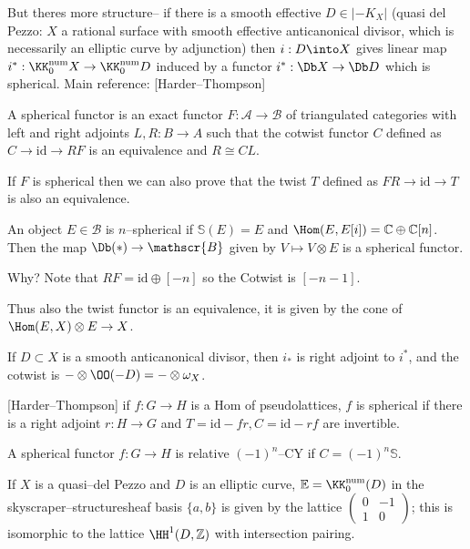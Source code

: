 But theres more structure-- if there is a smooth effective \(D\in |-K_X|\)
(quasi del Pezzo: \(X\) a rational surface with smooth effective anticanonical
divisor, which is necessarily an elliptic curve by adjunction) then \(i:D\into
X\) gives linear map \(i^\ast:\KK_0^\text{num}X\to \KK_0^\text{num}D\)
induced by a functor \(i^\ast: \Db X \to \Db D\) which is spherical. Main
reference: [Harder--Thompson]

\begin{definition}
    A spherical functor is an exact functor \(F:\mathcal{A}\to \mathcal{B}\) of
    triangulated categories with left and right adjoints \(L,R:B\to A\) such
    that the cotwist functor \(C\) defined as \(C\to \text{id}\to RF\) is an
    equivalence and \(R\cong CL\).
\end{definition}

If \(F\) is spherical then we can also prove that the twist \(T\) defined as
\(FR\to \text{id}\to T\) is also an equivalence.

\begin{example}
    An object \(E\in \mathscr{B}\) is \(n\)--spherical if \(\mathbb{S}(E)=E\)
    and \(\Hom(E,E[i])=\mathbb{C}\oplus \mathbb{C}[n]\).
    Then the map \(\Db(\ast)\to \mathscr{B}\) given by \(V\mapsto V\otimes E\)
    is a spherical functor.

    Why? Note that \(RF=\text{id}\oplus [-n]\) so the Cotwist is \([-n-1]\).

    Thus also the twist functor is an equivalence, it is given by the cone of
    \(\Hom(E,X)\otimes E \to X\).
\end{example}

If \(D\subset X\) is a smooth anticanonical divisor, then \(i_\ast\) is right
adjoint to \(i^\ast\),  and the cotwist is \(-\otimes \OO(-D)=-\otimes\omega_X\).

[Harder--Thompson] if \(f:G\to H\) is a Hom of pseudolattices, \(f\) is
spherical if there is a right adjoint \(r:H\to G\) and \(T=\text{id}-fr,
C=\text{id}-rf\) are invertible.

A spherical functor \(f:G\to H\) is relative \((-1)^n\)--CY if \(C=(-1)^n\mathbb{S}\).

If \(X\) is a quasi--del Pezzo and \(D\) is an elliptic curve,
\(\mathbb{E}=\KK_0^\text{num}(D)\) in the skyscraper--structuresheaf basis
\(\{a,b\}\) is given by the lattice \((\begin{smallmatrix} 0 & -1 \\ 1 &
0\end{smallmatrix})\); this is isomorphic to the lattice \(\HH^1(D,\mathbb{Z})\)
with intersection pairing.

